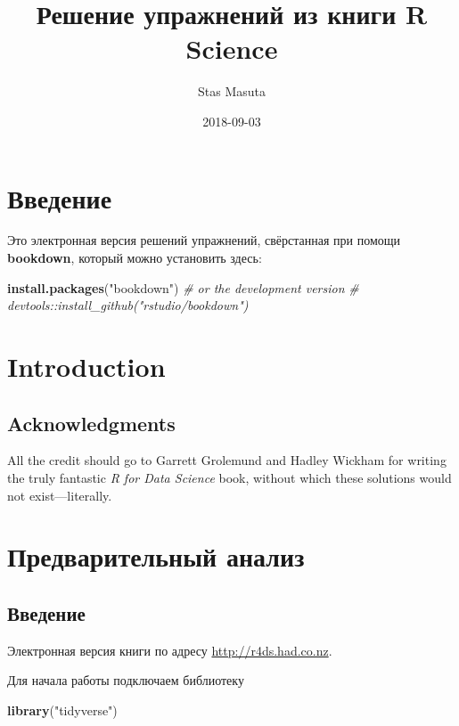 \documentclass[]{book}
\title{Решение упражнений из книги R Science}
\author{Stas Masuta}
\date{2018-09-03}
\newenvironment{Shaded}{\begin{snugshade}}{\end{snugshade}}
\newcommand{\KeywordTok}[1]{\textcolor[rgb]{0.13,0.29,0.53}{\textbf{#1}}}
\newcommand{\StringTok}[1]{\textcolor[rgb]{0.31,0.60,0.02}{#1}}
\newcommand{\CommentTok}[1]{\textcolor[rgb]{0.56,0.35,0.01}{\textit{#1}}}
\newcommand{\NormalTok}[1]{#1}
\begin{document}
\maketitle

{
\setcounter{tocdepth}{1}
\tableofcontents
}
\chapter{Введение}

Это электронная версия решений упражнений, свёрстанная при помощи
\textbf{bookdown}, который можно установить здесь:

\begin{Shaded}
\begin{Highlighting}[]
\KeywordTok{install.packages}\NormalTok{(}\StringTok{"bookdown"}\NormalTok{)}
\CommentTok{# or the development version}
\CommentTok{# devtools::install_github("rstudio/bookdown")}
\end{Highlighting}
\end{Shaded}

\chapter{Introduction}\label{introduction}

\section*{Acknowledgments}\label{acknowledgments}

All the credit should go to Garrett Grolemund and Hadley Wickham for
writing the truly fantastic \emph{R for Data Science} book, without
which these solutions would not exist---literally.

\chapter{Предварительный анализ}\label{-}

\section{Введение}\label{-1}

Электронная версия книги по адресу \url{http://r4ds.had.co.nz}.

Для начала работы подключаем библиотеку

\begin{Shaded}
\begin{Highlighting}[]
\KeywordTok{library}\NormalTok{(}\StringTok{"tidyverse"}\NormalTok{)}
\end{Highlighting}
\end{Shaded}
\end{document}
